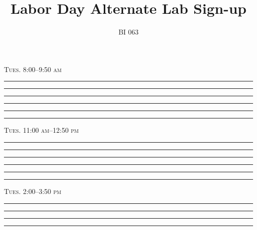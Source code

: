 \documentclass[11pt]{article}
\title{Labor Day Alternate Lab Sign-up}
\author{BI 063}
\date{}                                           %
\begin{document}
\maketitle
\thispagestyle{plain}

\Large

\begin{multicols}{2}

\textsc{Tues. 8:00–9:50 am}\vspace*{0.5cm}

\rule{2.5in}{0.4pt}\vspace*{0.5cm}

\rule{2.5in}{0.4pt}\vspace*{0.5cm}

\rule{2.5in}{0.4pt}\vspace*{0.5cm}

\rule{2.5in}{0.4pt}\vspace*{0.5cm}

\rule{2.5in}{0.4pt}\vspace*{0.5cm}

\rule{2.5in}{0.4pt}\vspace*{0.5cm}

\textsc{Tues. 11:00 am–12:50 pm}\vspace*{0.5cm}

\rule{2.5in}{0.4pt}\vspace*{0.5cm}

\rule{2.5in}{0.4pt}\vspace*{0.5cm}

\rule{2.5in}{0.4pt}\vspace*{0.5cm}

\rule{2.5in}{0.4pt}\vspace*{0.5cm}

\rule{2.5in}{0.4pt}\vspace*{0.5cm}

\rule{2.5in}{0.4pt}\vspace*{0.5cm}

\columnbreak

\textsc{Tues. 2:00–3:50 pm}\vspace*{0.5cm}

\rule{2.5in}{0.4pt}\vspace*{0.5cm}

\rule{2.5in}{0.4pt}\vspace*{0.5cm}

\rule{2.5in}{0.4pt}\vspace*{0.5cm}

\rule{2.5in}{0.4pt}\vspace*{0.5cm}


\end{multicols}
\end{document}
